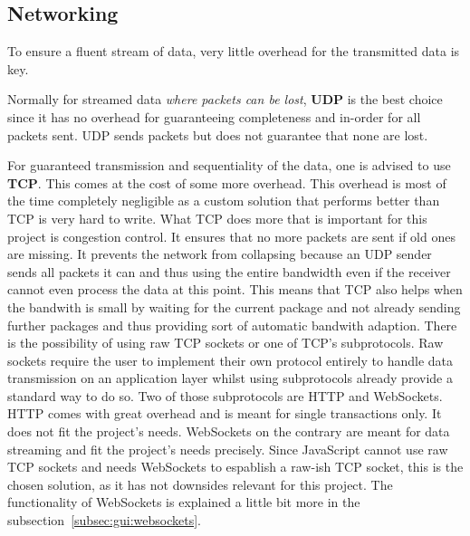 %
%

\subsection{Networking}
\label{subsec:gui:networking}

To ensure a fluent stream of data, very little overhead for the transmitted data is key.

Normally for streamed data \textit{where packets can be lost}, \textbf{UDP} is the best choice since it has no overhead for guaranteeing completeness and in-order for all packets sent.
UDP sends packets but does not guarantee that none are lost.

For guaranteed transmission and sequentiality of the data, one is advised to use \textbf{TCP}. This comes at the cost of some more overhead. This overhead is most of the time completely negligible as a custom solution that performs better than TCP is very hard to write. What TCP does more that is important for this project is congestion control. It ensures that no more packets are sent if old ones are missing. It prevents the network from collapsing because an UDP sender sends all packets it can and thus using the entire bandwidth even if the receiver cannot even process the data at this point.
This means that TCP also helps when the bandwith is small by waiting for the current package and not already sending further packages and thus providing sort of automatic bandwith adaption.
There is the possibility of using raw TCP sockets or one of TCP's subprotocols. Raw sockets require the user to implement their own protocol entirely to handle data transmission on an application layer whilst using subprotocols already provide a standard way to do so.
Two of those subprotocols are HTTP and WebSockets. HTTP comes with great overhead and is meant for single transactions only. It does not fit the project's needs.
WebSockets on the contrary are meant for data streaming and fit the project's needs precisely.
Since JavaScript cannot use raw TCP sockets and needs WebSockets to espablish a raw-ish TCP socket, this is the chosen solution, as it has not downsides relevant for this project.
The functionality of WebSockets is explained a little bit more in the subsection~\ref{subsec:gui:websockets}.

%
%

